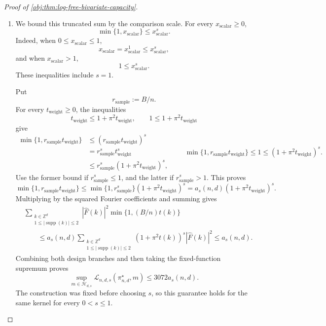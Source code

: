 \documentclass[11pt]{article}
\begin{document}
\begin{proof}[Proof of \cref{obj:thm:log-free-bivariate-capacity}]
\begin{enumerate}
\item
We bound this truncated sum by the comparison scale. For every
\(x_{\mathrm{scalar}}\geq0\),
\[
\min\{1,x_{\mathrm{scalar}}\}\leq x_{\mathrm{scalar}}^s.
\]
Indeed, when \(0\leq x_{\mathrm{scalar}}\leq1\),
\[
x_{\mathrm{scalar}}
=x_{\mathrm{scalar}}^1
\leq x_{\mathrm{scalar}}^s,
\]
and when \(x_{\mathrm{scalar}}>1\),
\[
1\leq x_{\mathrm{scalar}}^s.
\]
These inequalities include \(s=1\).

Put
\[
r_{\mathrm{sample}}:=B/n.
\]
For every \(t_{\mathrm{weight}}\geq0\), the inequalities
\[
t_{\mathrm{weight}}\leq1+\pi^2t_{\mathrm{weight}},
\qquad
1\leq1+\pi^2t_{\mathrm{weight}}
\]
give
\[
\begin{aligned}
\min\{1,r_{\mathrm{sample}}t_{\mathrm{weight}}\}
&\leq
(r_{\mathrm{sample}}t_{\mathrm{weight}})^s\\
&=
r_{\mathrm{sample}}^s t_{\mathrm{weight}}^s\\
&\leq
r_{\mathrm{sample}}^s(1+\pi^2t_{\mathrm{weight}})^s,
\end{aligned}
\qquad
\min\{1,r_{\mathrm{sample}}t_{\mathrm{weight}}\}
\leq1\leq(1+\pi^2t_{\mathrm{weight}})^s.
\]
Use the former bound if \(r_{\mathrm{sample}}^s\leq1\), and the latter if
\(r_{\mathrm{sample}}^s>1\). This proves
\[
\min\{1,r_{\mathrm{sample}}t_{\mathrm{weight}}\}
\leq
\min\{1,r_{\mathrm{sample}}^s\}
(1+\pi^2t_{\mathrm{weight}})^s
=
a_s(n,d)(1+\pi^2t_{\mathrm{weight}})^s.
\]
Multiplying by the squared Fourier coefficients and summing gives
\[
\begin{aligned}
&\sum_{\substack{k\in\mathbb Z^d\\
1\leq|\operatorname{supp}(k)|\leq2}}
|\widehat F(k)|^2\min\{1,(B/n)t(k)\}\\
&\qquad\leq
a_s(n,d)
\sum_{\substack{k\in\mathbb Z^d\\
1\leq|\operatorname{supp}(k)|\leq2}}
(1+\pi^2t(k))^s|\widehat F(k)|^2
\leq a_s(n,d).
\end{aligned}
\]
Combining both design branches and then taking the fixed-function supremum proves
\[
\sup_{m\in\mathcal H_{d,s}}
\mathcal L_{n,d,s}(\pi^\star_{n,d},m)
\leq3072a_s(n,d).
\]
The construction was fixed before choosing \(s\), so this guarantee holds for the same kernel for every \(0<s\leq1\).


\end{enumerate}
\end{proof}
\end{document}
